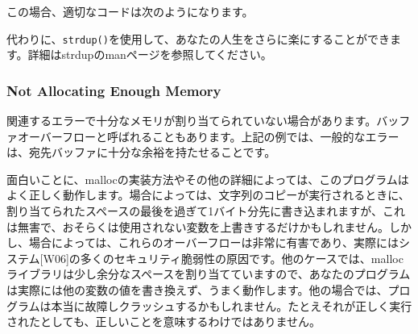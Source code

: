 この場合、適切なコードは次のようになります。

\begin{Shaded}
\begin{Highlighting}[]
\NormalTok{;}
\NormalTok{);}
\end{Highlighting}
\end{Shaded}

代わりに、\texttt{strdup()}を使用して、あなたの人生をさらに楽にすることができます。詳細はstrdupのmanページを参照してください。

\hypertarget{not-allocating-enough-memory}{%
\subsubsection*{Not Allocating Enough
Memory}\label{not-allocating-enough-memory}}

関連するエラーで十分なメモリが割り当てられていない場合があります。バッファオーバーフローと呼ばれることもあります。上記の例では、一般的なエラーは、宛先バッファに十分な余裕を持たせることです。

\begin{Shaded}
\begin{Highlighting}[]
\NormalTok{;}
\end{Highlighting}
\end{Shaded}

面白いことに、mallocの実装方法やその他の詳細によっては、このプログラムはよく正しく動作します。場合によっては、文字列のコピーが実行されるときに、割り当てられたスペースの最後を過ぎて1バイト分先に書き込まれますが、これは無害で、おそらくは使用されない変数を上書きするだけかもしれません。しかし、場合によっては、これらのオーバーフローは非常に有害であり、実際にはシステム{[}W06{]}の多くのセキュリティ脆弱性の原因です。他のケースでは、mallocライブラリは少し余分なスペースを割り当てていますので、あなたのプログラムは実際には他の変数の値を書き換えず、うまく動作します。他の場合では、プログラムは本当に故障しクラッシュするかもしれません。たとえそれが正しく実行されたとしても、正しいことを意味するわけではありません。

